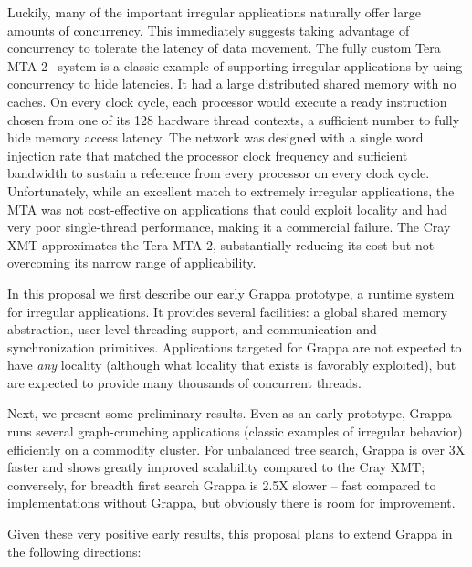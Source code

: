 Luckily, many of the important irregular applications naturally offer large
amounts of concurrency. This immediately suggests taking advantage of
concurrency to tolerate the latency of data movement. The fully custom Tera
MTA-2~\cite{tera:mta1} system is a classic example of supporting irregular
applications by using concurrency to hide latencies. It had a large
distributed shared memory with no caches. On every clock cycle, each processor
would execute a ready instruction chosen from one of its 128 hardware thread
contexts, a sufficient number to fully hide memory access latency. The network
was designed with a single word injection rate that matched the processor
clock frequency and sufficient bandwidth to sustain a reference from every
processor on every clock cycle. Unfortunately, while an excellent match to
extremely irregular applications, the MTA was not cost-effective on
applications that could exploit locality and had very poor single-thread
performance, making it a commercial failure. The Cray XMT approximates the
Tera MTA-2, substantially reducing its cost but not overcoming its narrow
range of applicability.

In this proposal we first describe our early
Grappa prototype, a runtime system for irregular
applications. It provides several facilities: a global shared memory
abstraction, user-level threading support, and communication and
synchronization primitives. Applications targeted for Grappa are not expected
to have \emph{any} locality (although what locality that exists is favorably
exploited), but are expected to provide many thousands of concurrent threads.

Next, we present some preliminary results. Even as an early prototype, Grappa
runs several graph-crunching applications (classic examples of irregular
behavior) efficiently on a commodity cluster. For unbalanced tree search,
Grappa is over 3X faster and shows greatly improved scalability compared to
the Cray XMT; conversely, for breadth first search Grappa is 2.5X slower --
fast compared to implementations without Grappa, but obviously there is room
for improvement. 

Given these very positive early results, this proposal plans to extend Grappa
in the following directions:

